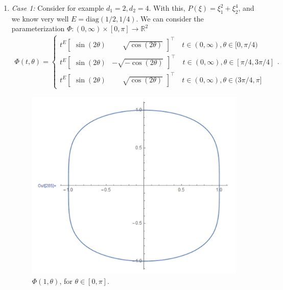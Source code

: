 \documentclass{article}
\theoremstyle{definition}
\begin{document}
\begin{enumerate}
\begin{enumerate}
		\begin{enumerate}		
		\item \textit{Case 1:} Consider for example $d_1 = 2, d_2 = 4$. With this, $P(\xi) = \xi_1^2 + \xi_2^4$,
		and we know very well $E = \text{diag}(1/2, 1/4)$. We can consider the parameterization $\Phi:(0,\infty)\times [0,\pi]\to \mathbb{R}^2$
		\begin{align}
		\Phi(t,\theta) = \begin{cases}
		t^E\begin{bmatrix}
		\sin (2\theta) &\,\,\,\,& \sqrt{\cos (2\theta)}
		\end{bmatrix}^\top \quad t\in (0,\infty), \theta \in [0,\pi/4)\\
		t^E\begin{bmatrix}
		\sin (2\theta) & -\sqrt{-\cos (2\theta)}
		\end{bmatrix}^\top \quad t\in (0,\infty), \theta \in [\pi/4,3\pi/4]\\
		t^E\begin{bmatrix}
		\sin (2\theta) &\,\,\,\,& \sqrt{\cos (2\theta)}
		\end{bmatrix}^\top \quad t\in (0,\infty), \theta \in (3\pi/4,\pi]
		\end{cases}.
		\end{align}
		\begin{figure}[!htb]
			\centering
			\includegraphics[scale=0.3]{param}
			\caption{$\Phi(1,\theta)$, for $\theta \in [0,\pi]$.}
		\end{figure}\\
	

\end{enumerate}
\end{enumerate}
\end{enumerate}
\end{document}
